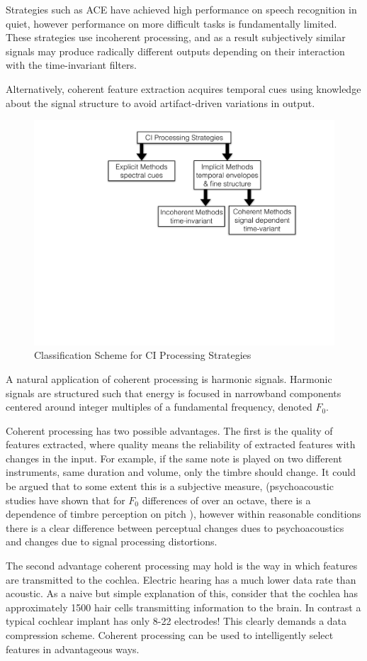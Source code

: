 \documentclass [11pt, proquest,oneside] {ganter_thesis}[2015/03/03]
\begin{document}
Strategies such as ACE have achieved high performance on speech recognition in quiet, however performance on more difficult tasks is fundamentally limited.  These strategies use incoherent processing, and as a result subjectively similar signals may produce radically different outputs depending on their interaction with the time-invariant filters.

Alternatively, coherent feature extraction acquires temporal cues using knowledge about the signal structure to avoid artifact-driven variations in output.

\begin{figure}[!ht]
  \centering
    \includegraphics[width=.6\textwidth]{explicitVimplicit}   
    \caption{Classification Scheme for CI Processing Strategies}\label{fig:explicitVimplicit}
\end{figure}

A natural application of coherent processing is harmonic signals.  Harmonic signals are structured such that energy is focused in narrowband components centered around integer multiples of a fundamental frequency, denoted $F_0$.

Coherent processing has two possible advantages.  The first is the quality of features extracted, where quality means the reliability of extracted features with changes in the input.  For example, if the same note is played on two different instruments, same duration and volume, only the timbre should change.  It could be argued that to some extent this is a subjective measure, (psychoacoustic studies have shown that for $F_0$ differences of over an octave, there is a dependence of timbre perception on pitch \cite{marozeau2003dependency}), however within reasonable conditions there is a clear difference between perceptual changes dues to psychoacoustics and changes due to signal processing distortions.

The second advantage coherent processing may hold is the way in which features are transmitted to the cochlea.  Electric hearing has a much lower data rate than acoustic.  As a naive but simple explanation of this, consider that the cochlea has approximately 1500 hair cells transmitting information to the brain.  In contrast a typical cochlear implant has only 8-22 electrodes!  This clearly demands a data compression scheme.  Coherent processing can be used to intelligently select features in advantageous ways.
\end{document}
